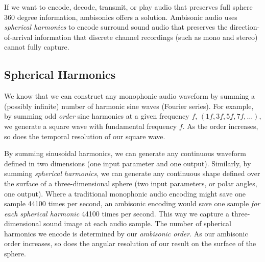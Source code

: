 If we want to encode, decode, transmit, or play audio that preserves
full sphere 360 degree information, ambisonics offers a solution.
Ambisonic audio uses \textit{spherical harmonics} to encode surround
sound audio that preserves the direction-of-arrival information that
discrete channel recordings (such as mono and stereo) cannot fully
capture.

\subsection{Spherical Harmonics}
\label{sec:spherical-harmonics}
We know that we can construct any monophonic audio waveform by summing
a (possibly infinite) number of harmonic sine waves (Fourier
series).
For example, by summing odd \textit{order} sine harmonics at a given
frequency $f$, $(1f, 3f, 5f, 7f, \ldots )$, we generate a square wave
with fundamental frequency $f$. As the order increases, so does the
temporal resolution of our square wave.

By summing sinusoidal harmonics, we can generate any continuous
waveform defined in two dimensions (one input parameter and one
output). Similarly, by summing \emph{spherical harmonics}, we can
generate any continuous shape defined over the surface of a
three-dimensional sphere (two input parameters, or polar angles, one
output). Where a traditional monophonic audio encoding might save one
sample 44100 times per second, an ambisonic encoding would save one
sample \emph{for each spherical harmonic} 44100 times per second. This
way we capture a three-dimensional sound image at each audio sample.
The number of spherical harmonics we encode is determined by our
\textit{ambisonic order}. As our ambisonic order increases, so does
the angular resolution of our result on the surface of the sphere.

